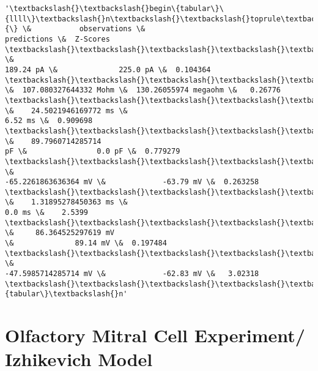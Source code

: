             \begin{tcolorbox}[breakable, size=fbox, boxrule=.5pt, pad at break*=1mm, opacityfill=0]
\begin{Verbatim}[commandchars=\\\{\}]
'\textbackslash{}\textbackslash{}begin\{tabular\}\{llll\}\textbackslash{}n\textbackslash{}\textbackslash{}toprule\textbackslash{}n\{\} \&           observations \&
predictions \&  Z-Scores \textbackslash{}\textbackslash{}\textbackslash{}\textbackslash{}\textbackslash{}n\textbackslash{}\textbackslash{}midrule\textbackslash{}nRheobaseTest                   \&
189.24 pA \&              225.0 pA \&  0.104364 \textbackslash{}\textbackslash{}\textbackslash{}\textbackslash{}\textbackslash{}nInputResistanceTest
\&  107.080327644332 Mohm \&  130.26055974 megaohm \&   0.26776
\textbackslash{}\textbackslash{}\textbackslash{}\textbackslash{}\textbackslash{}nTimeConstantTest               \&    24.5021946169772 ms \&
6.52 ms \&  0.909698 \textbackslash{}\textbackslash{}\textbackslash{}\textbackslash{}\textbackslash{}nCapacitanceTest                \&    89.7960714285714
pF \&                0.0 pF \&  0.779279 \textbackslash{}\textbackslash{}\textbackslash{}\textbackslash{}\textbackslash{}nRestingPotentialTest           \&
-65.2261863636364 mV \&             -63.79 mV \&  0.263258
\textbackslash{}\textbackslash{}\textbackslash{}\textbackslash{}\textbackslash{}nInjectedCurrentAPWidthTest     \&    1.31895278450363 ms \&
0.0 ms \&    2.5399 \textbackslash{}\textbackslash{}\textbackslash{}\textbackslash{}\textbackslash{}nInjectedCurrentAPAmplitudeTest \&     86.364525297619 mV
\&              89.14 mV \&  0.197484 \textbackslash{}\textbackslash{}\textbackslash{}\textbackslash{}\textbackslash{}nInjectedCurrentAPThresholdTest \&
-47.5985714285714 mV \&             -62.83 mV \&   3.02318
\textbackslash{}\textbackslash{}\textbackslash{}\textbackslash{}\textbackslash{}n\textbackslash{}\textbackslash{}bottomrule\textbackslash{}n\textbackslash{}\textbackslash{}end\{tabular\}\textbackslash{}n'
\end{Verbatim}
\end{tcolorbox}
        
    \hypertarget{olfactory-mitral-cell-experiment-izhikevich-model}{%
\section{Olfactory Mitral Cell Experiment/ Izhikevich
Model}\label{olfactory-mitral-cell-experiment-izhikevich-model}}

